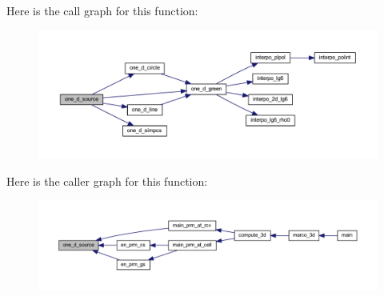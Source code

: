 Here is the call graph for this function\+:
\nopagebreak
\begin{figure}[H]
\begin{center}
\leavevmode
\includegraphics[width=350pt]{Marco_8f90_a278c841b3ca2d9c2a1e36c458d370cbe_cgraph}
\end{center}
\end{figure}
Here is the caller graph for this function\+:
\nopagebreak
\begin{figure}[H]
\begin{center}
\leavevmode
\includegraphics[width=350pt]{Marco_8f90_a278c841b3ca2d9c2a1e36c458d370cbe_icgraph}
\end{center}
\end{figure}
\mbox{\label{Marco_8f90_ac7754a681e0f0decb7a67b65fffe3745}} 
